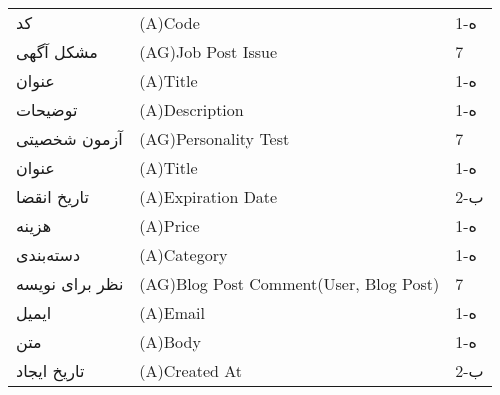 \documentclass[12pt]{article}
\begin{document}
\begin{table}[]
\begin{tabular}{lll}
			کد                                   & (A)Code                                                                                                       & 1-ه   \\
			مشکل آگهی                            & (AG)Job Post Issue                                                                                            & 7     \\
			عنوان                                & (A)Title                                                                                                      & 1-ه   \\
			توضیحات                              & (A)Description                                                                                                & 1-ه   \\
			آزمون شخصیتی                         & (AG)Personality Test                                                                                          & 7     \\
			عنوان                                & (A)Title                                                                                                      & 1-ه   \\
			تاریخ انقضا                          & (A)Expiration Date                                                                                            & 2-ب   \\
			هزینه                                & (A)Price                                                                                                      & 1-ه   \\
			دسته‌بندی                            & (A)Category                                                                                                   & 1-ه   \\
			نظر برای نویسه                       & (AG)Blog Post Comment(User, Blog Post)                                                                        & 7     \\
			ایمیل                                & (A)Email                                                                                                      & 1-ه   \\
			متن                                  & (A)Body                                                                                                       & 1-ه   \\
			تاریخ ایجاد                          & (A)Created At                                                                                                 & 2-ب   \\

\end{tabular}
\end{table}
\end{document}
